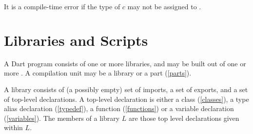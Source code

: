 \documentclass[makeidx]{article}
\begin{document}
{\LMHash{}%
It is a compile-time error if the type of $c$ may not be assigned to .









\section{Libraries and Scripts}

\LMHash{}%
A Dart program consists of one or more libraries, and may be built out of one or more .
A compilation unit may be a library or a part (\ref{parts}).

\LMHash{}%
A library consists of (a possibly empty) set of imports, a set of exports, and a set of top-level declarations.
A top-level declaration is either a class (\ref{classes}), a type alias declaration (\ref{typedef}), a function (\ref{functions}) or a variable declaration (\ref{variables}).
The members of a library $L$ are those top level declarations given within $L$.

}
\end{document}
